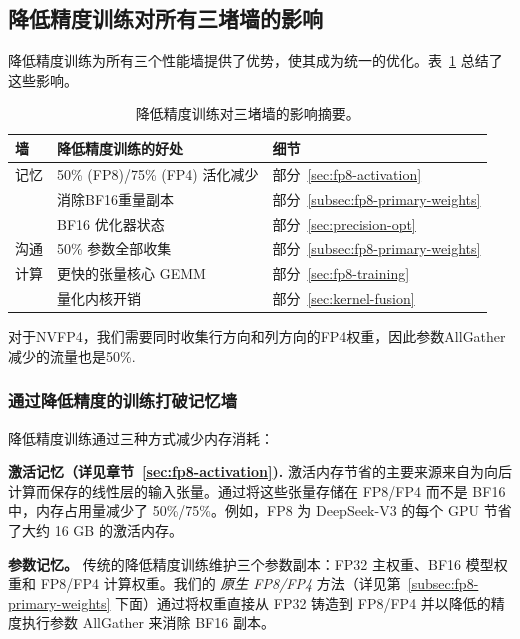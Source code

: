 \subsection{降低精度训练对所有三堵墙的影响}

降低精度训练为所有三个性能墙提供了优势，使其成为统一的优化。表~\ref{tab:fp8-impact-summary} 总结了这些影响。

\begin{table}[ht]
\centering
\begin{threeparttable}
\caption{降低精度训练对三堵墙的影响摘要。}
\label{tab:fp8-impact-summary}
\begin{tabular}{lll}
\toprule
\textbf{墙} & \textbf{降低精度训练的好处} & \textbf{细节} \\
\midrule
记忆 & 50\% (FP8)/75\% (FP4) 活化减少 & 部分~\ref{sec:fp8-activation} \\
        & 消除BF16重量副本 & 部分~\ref{subsec:fp8-primary-weights} \\
        & BF16 优化器状态 & 部分~\ref{sec:precision-opt} \\
\midrule
沟通 & 50\% 参数全部收集 \tnote{1} & 部分~\ref{subsec:fp8-primary-weights} \\
\midrule
计算 & 更快的张量核心 GEMM & 部分~\ref{sec:fp8-training} \\
        & 量化内核开销 & 部分~\ref{sec:kernel-fusion} \\
\bottomrule
\end{tabular}
\begin{tablenotes}
    \footnotesize
    \item[1] 对于NVFP4，我们需要同时收集行方向和列方向的FP4权重，因此参数AllGather减少的流量也是50\%.
\end{tablenotes}
\end{threeparttable}
\end{table}

\subsubsection{通过降低精度的训练打破记忆墙}

降低精度训练通过三种方式减少内存消耗：

\textbf{激活记忆（详见章节~\ref{sec:fp8-activation}).} 激活内存节省的主要来源来自为向后计算而保存的线性层的输入张量。通过将这些张量存储在 FP8/FP4 而不是 BF16 中，内存占用量减少了 50\%/75\%。例如，FP8 为 DeepSeek-V3 的每个 GPU 节省了大约 16 GB 的激活内存。

\textbf{参数记忆。} 传统的降低精度训练维护三个参数副本：FP32 主权重、BF16 模型权重和 FP8/FP4 计算权重。我们的 \emph{原生 FP8/FP4} 方法（详见第~\ref{subsec:fp8-primary-weights} 下面）通过将权重直接从 FP32 铸造到 FP8/FP4 并以降低的精度执行参数 AllGather 来消除 BF16 副本。

